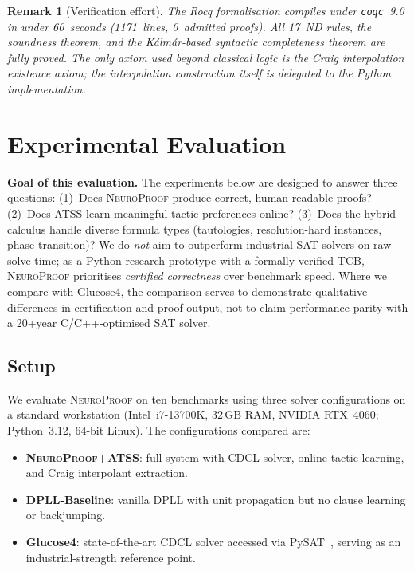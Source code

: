 \documentclass[conference]{IEEEtran}
\newtheorem{remark}[theorem]{Remark}
\newcommand{\NP}{\textsc{NeuroProof}}
\newcommand{\ATSS}{\textsc{ATSS}}
\begin{document}
\begin{remark}[Verification effort]
  The Rocq formalisation compiles under \texttt{coqc}~9.0 in under
  60~seconds (1171~lines, 0~admitted proofs).  All 17~ND rules, the
  soundness theorem, and the K\'{a}lm\'{a}r-based syntactic completeness
  theorem are fully proved.  The only axiom used beyond classical logic
  is the Craig interpolation existence axiom; the interpolation
  construction itself is delegated to the Python implementation.
\end{remark}

\section{Experimental Evaluation}
\label{sec:experiments}

\textbf{Goal of this evaluation.}  The experiments below are designed
to answer three questions: (1)~Does \NP{} produce correct,
human-readable proofs? (2)~Does ATSS learn meaningful tactic
preferences online? (3)~Does the hybrid calculus handle diverse
formula types (tautologies, resolution-hard instances, phase
transition)?  We do \emph{not} aim to outperform industrial SAT
solvers on raw solve time; as a Python research prototype with a
formally verified TCB, \NP{} prioritises \emph{certified correctness}
over benchmark speed.  Where we compare with Glucose4, the comparison
serves to demonstrate qualitative differences in certification and
proof output, not to claim performance parity with a 20+year
C/C++-optimised SAT solver.

\subsection{Setup}

We evaluate \NP{} on ten benchmarks using three solver configurations
on a standard workstation (Intel~i7-13700K, 32\,GB RAM, NVIDIA
RTX~4060; Python~3.12, 64-bit Linux).  The
configurations compared are:
\begin{itemize}
  \item \textbf{\NP{}+\ATSS{}}: full system with CDCL solver,
    online tactic learning, and Craig interpolant extraction.
  \item \textbf{DPLL-Baseline}: vanilla DPLL with unit propagation
    but no clause learning or backjumping.
  \item \textbf{Glucose4}: state-of-the-art CDCL solver accessed via
    PySAT~\cite{EenSorensson2003}, serving as an industrial-strength
    reference point.
\end{itemize}
\end{document}
